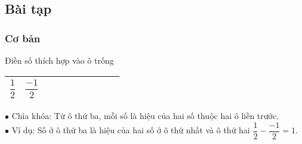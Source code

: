 \subsection{Bài tạp}
\subsubsection{Cơ bản}
\begin{bt}%
	Điền số thích hợp vào ô trống 
	\begin{center}
		\begin{tabular}{|c|c|c|c|c|c|c|c|c|c|}
			\hline
			$\dfrac{1}{2}$ & $\dfrac{-1}{2}$ & \sh{$1$} & \sh{$-1\dfrac{1}{2}$} & \sh{$2\dfrac{1}{2}$} & \sh{$6\dfrac{1}{2}$} & \sh{$-10\dfrac{1}{2}$}& \sh{$17$} & \sh{$-27\dfrac{1}{2}$}\\
			\hline
		\end{tabular}
	\end{center}
	$\bullet$ Chìa khóa: Từ ô thứ ba, mỗi số là hiệu của hai số thuộc hai ô liền trước. \\
	$\bullet$ Ví dụ: Số ở ô thứ ba là hiệu của hai số ở ô thứ nhất và ô thứ hai $\dfrac{1}{2}-\dfrac{-1}{2}=1$.
\end{bt}
